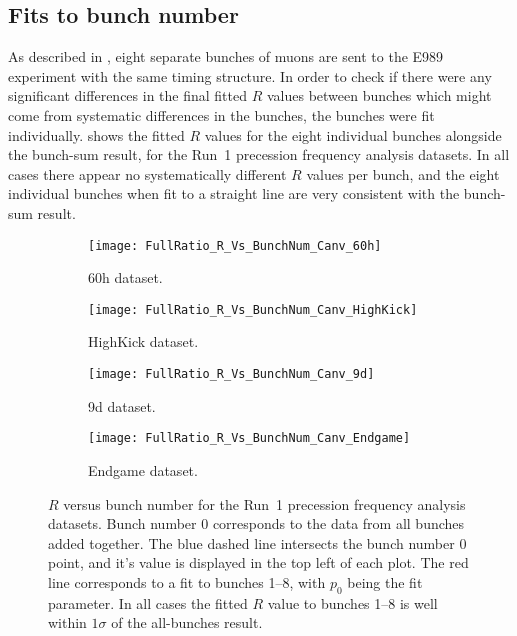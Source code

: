 \clearpage


\subsection{Fits to bunch number}


As described in , eight separate bunches of muons are sent to the E989 experiment with the same timing structure. In order to check if there were any significant differences in the final fitted $R$ values between bunches which might come from systematic differences in the bunches, the bunches were fit individually.  shows the fitted $R$ values for the eight individual bunches alongside the bunch-sum result, for the Run~1 precession frequency analysis datasets. In all cases there appear no systematically different $R$ values per bunch, and the eight individual bunches when fit to a straight line are very consistent with the bunch-sum result.



\begin{figure}[]
\centering
    \begin{subfigure}[]{0.45\textwidth}
        \centering
        \texttt{[image: FullRatio\_R\_Vs\_BunchNum\_Canv\_60h]}
        \caption{60h dataset.}
    \end{subfigure}%
    \begin{subfigure}[]{0.45\textwidth}
        \centering
        \texttt{[image: FullRatio\_R\_Vs\_BunchNum\_Canv\_HighKick]}
        \caption{HighKick dataset.}
    \end{subfigure}

    \begin{subfigure}[]{0.45\textwidth}
        \centering
        \texttt{[image: FullRatio\_R\_Vs\_BunchNum\_Canv\_9d]}
        \caption{9d dataset.}
    \end{subfigure}%
    \begin{subfigure}[]{0.45\textwidth}
        \centering
        \texttt{[image: FullRatio\_R\_Vs\_BunchNum\_Canv\_Endgame]}
        \caption{Endgame dataset.}
    \end{subfigure}
\caption[$R$ versus bunch number]{$R$ versus bunch number for the Run~1 precession frequency analysis datasets. Bunch number 0 corresponds to the data from all bunches added together. The blue dashed line intersects the bunch number 0 point, and it's value is displayed in the top left of each plot. The red line corresponds to a fit to bunches 1--8, with $p_{0}$ being the fit parameter. In all cases the fitted $R$ value to bunches 1--8 is well within $1\sigma$ of the all-bunches result.}
\label{fig:bunchNum_R}
\end{figure}



